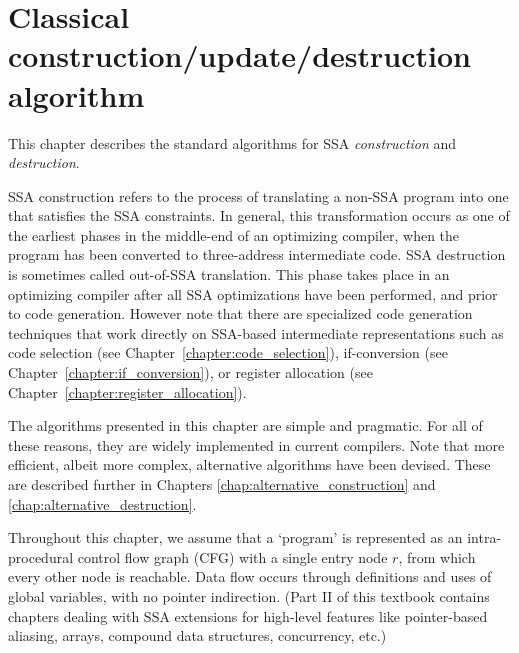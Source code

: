 \chapter{Classical construction/update/destruction algorithm }
\label{chap:classical_construction}


\def\phiops{$\phi$-functions}
\def\phiop{$\phi$-function}


This chapter describes the standard algorithms for SSA \textit{construction} and
\textit{destruction}.

SSA construction refers to the process of translating a non-SSA program into
one that satisfies the SSA constraints. In general, this transformation
occurs as one of the
earliest phases in the middle-end of an optimizing compiler, when the program
has been converted to three-address intermediate code.
SSA destruction is sometimes called out-of-SSA translation. This phase
takes place in an optimizing compiler after all SSA optimizations have
been performed, and prior to code generation. However note that there are
specialized code generation techniques that work directly on SSA-based
intermediate representations such as code selection (see Chapter~\ref{chapter:code_selection}), if-conversion (see Chapter~\ref{chapter:if_conversion}), or register allocation (see Chapter~\ref{chapter:register_allocation}).

The algorithms presented in this chapter are simple and pragmatic.
For all of these reasons, they are widely implemented in current compilers.
Note that more
efficient, albeit more complex, alternative algorithms have been devised.
These are described further in Chapters \ref{chap:alternative_construction}
and \ref{chap:alternative_destruction}.

Throughout this chapter,
we assume that a `program' is represented as an
intra-procedural control flow graph (CFG)
with a single entry node $r$, from which every other
node is reachable.
Data flow occurs through definitions and uses of 
global variables, with no pointer indirection.
(Part II of this textbook contains chapters dealing with
SSA extensions for high-level features like
pointer-based aliasing, arrays, compound data structures, concurrency, etc.)



